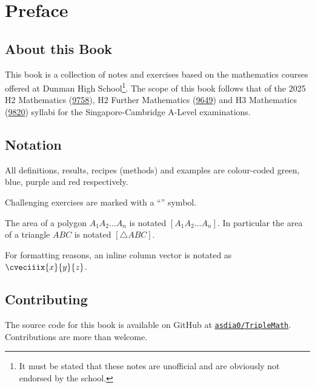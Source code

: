 \chapter*{Preface}

\section*{About this Book}

This book is a collection of notes and exercises based on the mathematics courses offered at Dunman High School\footnote{It must be stated that these notes are unofficial and are obviously not endorsed by the school.}. The scope of this book follows that of the 2025 H2 Mathematics (\href{https://www.seab.gov.sg/files/A%20Level%20Syllabus%20Sch%20Cddts/2025/8865_y25_sy.pdf}{9758}), H2 Further Mathematics (\href{https://www.seab.gov.sg/files/A%20Level%20Syllabus%20Sch%20Cddts/2025/9649_y25_sy.pdf}{9649}) and H3 Mathematics (\href{https://www.seab.gov.sg/files/A%20Level%20Syllabus%20Sch%20Cddts/2025/9820_y25_sy.pdf}{9820}) syllabi for the Singapore-Cambridge A-Level examinations.

\section*{Notation}

All definitions, results, recipes (methods) and examples are colour-coded green, blue, purple and red respectively. 

Challenging exercises are marked with a ``\chili'' symbol.

The area of a polygon $A_1 A_2 \dots A_n$ is notated $[A_1 A_2 \dots A_n]$. In particular the area of a triangle $ABC$ is notated $[\triangle ABC]$.

For formatting reasons, an inline column vector is notated as $\cveciiix{x}{y}{z}$.

\section*{Contributing}

The source code for this book is available on GitHub at \href{https://github.com/asdia0/TripleMath}{\texttt{asdia0/TripleMath}}. Contributions are more than welcome.